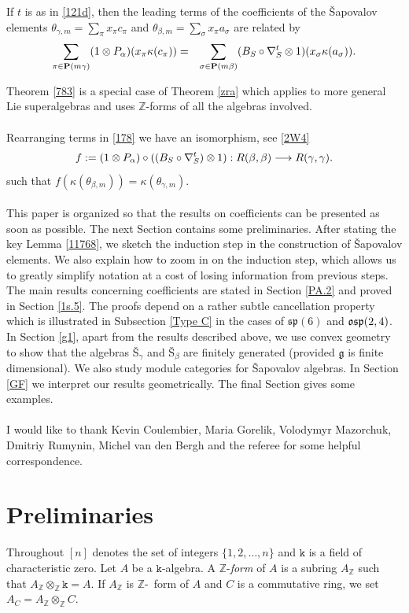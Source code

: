 \documentclass{article}
\def\Z{{\mathbb Z}}
\newcommand{\ttk}{\mathtt{k}}
\newcommand{\noi}{\noindent}
\newcommand{\ga}{\alpha}
\newcommand{\gb}{\beta}
\newcommand{\gc}{\gamma}
\newcommand{\gs}{\sigma}
\newcommand{\gk}{\kappa}
\newcommand{\ot}{\otimes}
\newcommand{\fg}{\mathfrak{g}}\newcommand{\fgl}{\mathfrak{gl}}\newcommand{\so}{\mathfrak{so}}
\newcommand{\fsp}{\mathfrak{sp}}
\newcommand{\ci}{\circ} \newcommand{\ti}{\times}
\newcommand{\ey}{\end{eqnarray}}
\newcommand{\by}{\begin{eqnarray}}
\newcommand{\bt}{\begin{theorem}}
\newcommand{\et}{\end{theorem}}
\newcommand{\be}{\begin{equation}}
\newcommand{\ee}{\end{equation}}
\begin{document}
\bt \label{783} If $t $ is as in  
\eqref{121d}, 
then the leading terms of the coefficients of the Šapovalov elements $\theta_{\gamma,m}=\sum_{\pi }  x_{\pi} c_\pi$ and $\theta_{\gb,m}
=\sum_{\gs }  x_{\pi} a_\gs$ are related by
\by 
\label{178} \sum_{\pi \in {\bf P}(m\gc)}  (1\ot P_\ga)( x_{\pi} \gk(c_\pi))
&=& \sum_{\gs \in {{\bf P}}(m\gb)} (B_S\ci\nabla_S^t\ot 1)(x_{\gs}  \gk(a_\gs)). 
\ey 
\et\noi
Theorem \ref{783} is a special case of  Theorem \ref{zra} which  applies to more general Lie superalgebras and uses $\Z$-forms of all the algebras involved.
\\ \\Rearranging terms in \eqref{178} we  have an isomorphism, see \eqref{2W4}  
\be \label{eeh} f: =
(1\ot P_\ga)\ci ((B_S\ci\nabla_S^t)\ot 1): R(\gb,\gb)\lra  R(\gc,\gc).\ee  such that 
$f(\gk({\theta}_{\gb,m}))=\gk({\theta}_{\gc,m}).$ 
\\ \\  
This paper is organized so that the results on coefficients can be presented as soon as possible.
\noi The next Section contains some preliminaries. After stating the key Lemma \ref{11768},  we sketch the induction step in the construction of \v Sapovalov elements. We also explain how to zoom in on the induction step, which allows us to greatly simplify notation at a cost of losing information from previous steps. 
The main results concerning coefficients are stated in Section \ref{PA.2} and proved in Section \ref{1s.5}. The proofs depend on a rather subtle cancellation property which is illustrated in Subsection \ref{Type C} in the cases of $\fsp(6)$ and $\mathfrak{osp}(2,4)$. In 
Section \ref{g1}, apart from the results described above, we use convex geometry to show that 
the algebras Š$_\gc$  and Š$_\gb$  are finitely generated %
(provided $\fg $ is finite dimensional). We also study module categories for \v Sapovalov   algebras. 
In Section \ref{GF} we interpret our results geometrically. The final Section gives some examples.
\\ \\%
I would like to thank 
Kevin Coulembier,   Maria Gorelik, 
Volodymyr Mazorchuk, Dmitriy Rumynin,  Michel van den Bergh and the referee for some helpful correspondence.

\section{Preliminaries} \label{sss7.1}
 Throughout $[n]$ denotes the set of integers 
$\{1,2,\ldots,n\}$ and 
$\ttk$ is a field of characteristic zero. Let $A$ be a $\ttk$-algebra.  
A $\Z$-{\it  form} of $A$ 
 is a subring $A_\Z $  such that 
$A_\Z\ot_\Z \ttk =A$. 
If $A_\Z $  is $\Z$-{\  form} of $A$ 
 and $C$ is a commutative ring, we set $A_C =A_\Z\ot_\Z C$. 
\end{document}
